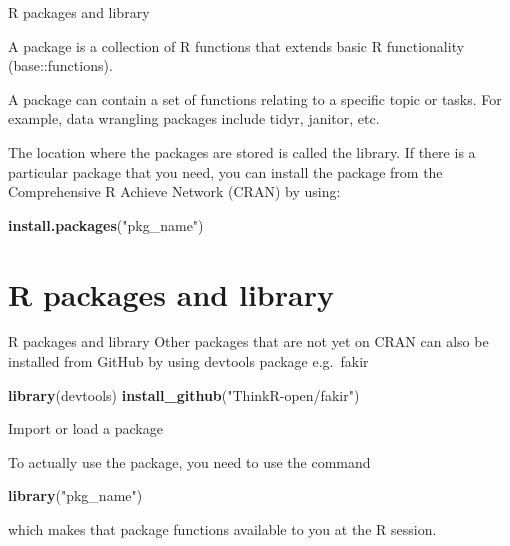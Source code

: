 \documentclass[
  ignorenonframetext,
]{beamer}
\newenvironment{Shaded}{\begin{snugshade}}{\end{snugshade}}
\newcommand{\KeywordTok}[1]{\textcolor[rgb]{0.13,0.29,0.53}{\textbf{#1}}}
\newcommand{\NormalTok}[1]{#1}
\newcommand{\StringTok}[1]{\textcolor[rgb]{0.31,0.60,0.02}{#1}}
\begin{document}
\begin{frame}[fragile]{R packages and library}
\protect\hypertarget{r-packages-and-library}{}

A package is a collection of R functions that extends basic R
functionality (base::functions). \pause

A package can contain a set of functions relating to a specific topic or
tasks. For example, data wrangling packages include tidyr, janitor, etc.
\pause

The location where the packages are stored is called the library. If there is a particular package that you need, you can install the package from the Comprehensive R Achieve Network (CRAN) by using:\pause

\begin{Shaded}
\begin{Highlighting}[]
\KeywordTok{install.packages}\NormalTok{(}\StringTok{"pkg_name"}\NormalTok{)}
\end{Highlighting}
\end{Shaded}

\end{frame}
\section{R packages and library}
\begin{frame}[fragile]{R packages and library}
\protect\hypertarget{r-packages-and-library-1}{}
\pause
Other packages that are not yet on CRAN can also be installed from
GitHub by using devtools package e.g.~fakir \pause

\begin{Shaded}
\begin{Highlighting}[]
\KeywordTok{library}\NormalTok{(devtools)}
\KeywordTok{install_github}\NormalTok{(}\StringTok{"ThinkR-open/fakir"}\NormalTok{)}
\end{Highlighting}
\end{Shaded}

\end{frame}

\begin{frame}[fragile]{Import or load a package}
\protect\hypertarget{import-or-load-a-package}{}

\pause
To actually use the package, you need to use the command
\pause
\begin{Shaded}
\begin{Highlighting}[]
\KeywordTok{library}\NormalTok{(}\StringTok{"pkg_name"}\NormalTok{)}
\end{Highlighting}
\end{Shaded}
\pause
which makes that package functions available to you at the R session.

\end{frame}
\end{document}
